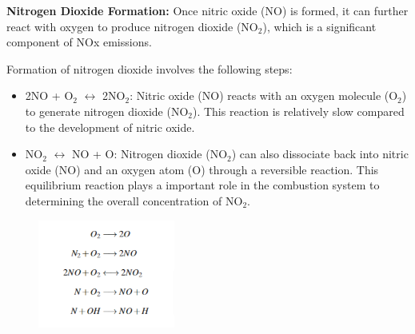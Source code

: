 \textbf{Nitrogen Dioxide Formation:}
Once nitric oxide (NO) is formed, it can further react with oxygen to produce nitrogen dioxide (NO$_2$), which is a significant component of NOx emissions.

Formation of nitrogen dioxide involves the following steps:
\begin{itemize}
    \item 2NO + O$_2$ $\longleftrightarrow$ 2NO$_2$: Nitric oxide (NO) reacts with an oxygen molecule (O$_2$) to generate nitrogen dioxide (NO$_2$). 
This reaction is relatively slow compared to the development of nitric oxide.
\item NO$_2$ $\longleftrightarrow$ NO + O: Nitrogen dioxide (NO$_2$) can also dissociate back into nitric oxide (NO) and an oxygen atom (O) through a reversible reaction. 
This equilibrium reaction plays a important role in the combustion system to determining the overall concentration of NO$_2$.
\end{itemize}

\begin{figure}[h]
	\centering
	\includegraphics[width=0.4\textwidth]{Chapter1/Images/reaction4.png}
\end{figure}

